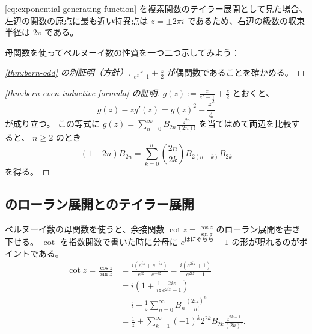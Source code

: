 {\autoref{eq:exponential-generating-function} を複素関数のテイラー展開として見た場合、左辺の関数の原点に最も近い特異点は $z=\pm 2\pi i$ であるため、右辺の級数の収束半径は $2\pi$ である。

母関数を使ってベルヌーイ数の性質を一つ二つ示してみよう：
\begin{proof}[\autoref{thm:bern-odd} の別証明（方針）]
  $\frac{z}{e^z-1}+\frac{z}{2}$ が偶関数であることを確かめる。
\end{proof}

\begin{proof}[\autoref{thm:bern-even-inductive-formula} の証明]
  $g(z):=\frac{z}{e^z-1}+\frac{z}{2}$ とおくと、
  \[g(z)-zg'(z)=g(z)^2-\frac{z^2}{4}\]
  が成り立つ。
  この等式に $g(z)=\sum_{n=0}^\infty B_{2n}\frac{z^{2n}}{(2n)!}$ を当てはめて両辺を比較すると、 $n\ge 2$ のとき
  \[(1-2n)B_{2n}=\sum_{k=0}^n\binom{2n}{2k}B_{2(n-k)}B_{2k}\]
  を得る。
\end{proof}


\subsection[余接関数のローラン展開と正接関数のテイラー展開]{のローラン展開とのテイラー展開}

ベルヌーイ数の母関数を使うと、余接関数 $\cot z=\frac{\cos z}{\sin z}$ のローラン展開を書き下せる。
$\cot$ を指数関数で書いた時に分母に $e^{\text{ほにゃらら}}-1$ の形が現れるのがポイントである。
\begin{align*}
  \cot z=\frac{\cos z}{\sin z}
  &=\frac{i(e^{iz}+e^{-iz})}{e^{iz}-e^{-iz}}
    =\frac{i(e^{2iz}+1)}{e^{2iz}-1} \\
  &=i\left(1+\frac{1}{iz}\frac{2iz}{e^{2iz}-1}\right) \\
  &=i+\frac{1}{z}\sum_{n=0}^\infty B_n\frac{(2iz)^n}{n!} \\
  &=\frac{1}{z}+\sum_{k=1}^\infty (-1)^k 2^{2k} B_{2k}\frac{z^{2k-1}}{(2k)!}.
\end{align*}

}
